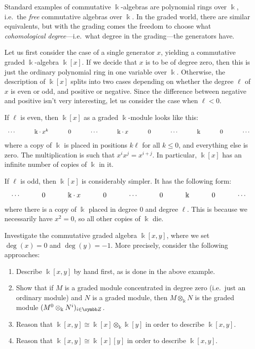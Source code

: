 \begin{example}
	Standard examples of commutative \(\Bbbk\)-algebras are polynomial rings over \(\Bbbk\), i.e.\ the \emph{free} commutative algebras over \(\Bbbk\).
	In the graded world, there are similar equivalents, but with the grading comes the freedom to choose what \emph{cohomological degree}---i.e.\ what degree in the grading---the generators
	have.

	Let us first consider the case of a single generator \(x\), yielding a commutative graded \(\Bbbk\)-algebra \(\Bbbk[x]\). If we decide that \(x\) is to be of degree zero,
	then this is just the ordinary polynomial ring in one variable over \(\Bbbk\). Otherwise, the description of \(\Bbbk[x]\) splits into two cases depending on whether the
	degree \(\ell\) of \(x\) is even or odd, and positive or negative. Since the difference between negative and positive isn't very interesting, let us consider
	the case when \(\ell < 0\).

	If \(\ell\) is even, then \(\Bbbk[x]\) as a graded \(\Bbbk\)-module looks like this:
	\[
	\begin{tikzcd}
		\cdots & \Bbbk \cdot x^{k} & 0 & \cdots & \Bbbk \cdot x & 0 & \cdots & \Bbbk & 0 & \cdots
	\end{tikzcd}
	\]
	where a copy of \(\Bbbk\) is placed in positions \(k\ell\) for all \(k \leq 0\), and everything else is zero. The multiplication is such that \(x^{i}x^j = x^{i+j}\).
	In particular, \(\Bbbk[x]\) has an infinite number of copies of \(\Bbbk\) in it.

	If \(\ell\) is odd, then \(\Bbbk[x]\) is considerably simpler. It has the following form:
	\[
	\begin{tikzcd}
		\cdots & 0 & \Bbbk\cdot x & 0 & \cdots & 0 & \Bbbk & 0 & \cdots
	\end{tikzcd}
	\]
	where there is a copy of \(\Bbbk\) placed in degree 0 and degree \(\ell\). This is because we necessarily have \(x^2 = 0\), so all other copies of \(\Bbbk\) die.
\end{example}
\begin{exercise}
	Investigate the commutative graded algebra \(\Bbbk[x,y]\), where we set \(\deg(x) = 0\) and \(\deg(y)=-1\). More precisely, consider the following approaches:
	\begin{enumerate}[label=(\arabic*)]
		\item Describe \(\Bbbk[x,y]\) by hand first, as is done in the above example.
		\item Show that if \(M\) is a graded module concentrated in degree zero (i.e.\ just an ordinary module) and \(N\) is a graded
		module, then \(M\otimes_\Bbbk N\) is the graded module \((M^0\otimes_\Bbbk N^i)_{i\in\Z}\).
		\item Reason that \(\Bbbk[x,y] \cong \Bbbk[x]\otimes_\Bbbk\Bbbk[y]\) in order to describe \(\Bbbk[x,y]\).
		\item Reason that \(\Bbbk[x,y] \cong \Bbbk[x][y]\) in order to describe \(\Bbbk[x,y]\).
	\end{enumerate}
\end{exercise}

